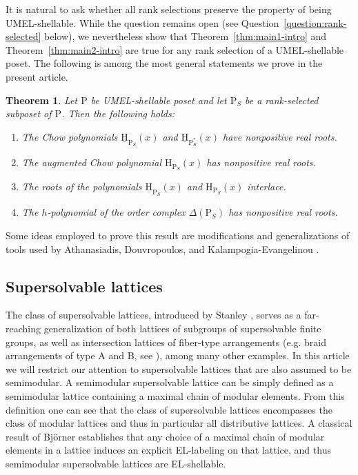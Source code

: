 \documentclass[11pt,a4paper]{amsart}
\theoremstyle{results}
\newtheorem{thm}{Theorem}[section]
\theoremstyle{definitions}
\def\P{\mathbb{P}}
\newcommand{\uH}{\underline{\mathrm{H}}}
\renewcommand{\P}{\mathrm{P}}
\renewcommand{\H}{\mathrm{H}}
\begin{document}
It is natural to ask whether all rank selections preserve the property of being UMEL-shellable. While the question remains open (see Question~\ref{question:rank-selected} below), we nevertheless show that Theorem~\ref{thm:main1-intro} and Theorem~\ref{thm:main2-intro} are true for any rank selection of a UMEL-shellable poset. The following is among the most general statements we prove in the present article.

\begin{thm}\label{thm:main3-intro}
    Let $\P$ be UMEL-shellable poset and let $\P_S$ be a rank-selected subposet of $\P$. Then the following holds:
    \begin{enumerate}[\normalfont (i)]
        \item The Chow polynomials $\uH_{\P_S}(x)$ and $\uH_{\P_S^*}(x)$ have nonpositive real roots.
        \item The augmented Chow polynomial $\H_{\P_S}(x)$ has nonpositive real roots.
        \item The roots of the polynomials $\uH_{\P_S}(x)$ and $\H_{\P_S}(x)$ interlace.
        \item The $h$-polynomial of the order complex $\Delta(\P_S)$ has nonpositive real roots.
    \end{enumerate}
\end{thm}

Some ideas employed to prove this result are modifications and generalizations of tools used by Athanasiadis, Douvropoulos, and Kalampogia-Evangelinou \cite{athanasiadis-douvropoulos-kalampogia}.

\subsection{Supersolvable lattices}
The class of supersolvable lattices, introduced by Stanley \cite{stanley1972supersolvable}, serves as a far-reaching generalization of both lattices of subgroups of supersolvable finite groups, as well as intersection lattices of fiber-type arrangements (e.g. braid arrangements of type A and B, see \cite{OT_1992}), among many other examples. In this article we will restrict our attention to supersolvable lattices that are also assumed to be semimodular. A semimodular supersolvable lattice can be simply defined as a semimodular lattice containing a maximal chain of modular elements. From this definition one can see that the class of supersolvable lattices encompasses the class of modular lattices and thus in particular all distributive lattices. A classical result of Björner \cite{bjorner-el-shellable} establishes that any choice of a maximal chain of modular elements in a lattice induces an explicit EL-labeling on that lattice, and thus semimodular supersolvable lattices are EL-shellable. 
\end{document}
